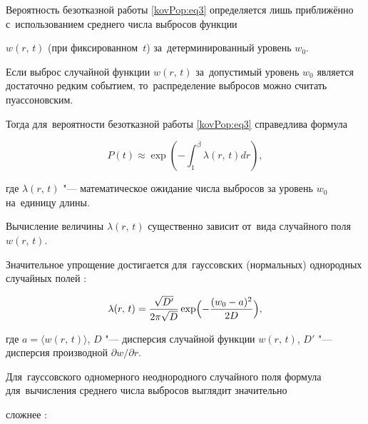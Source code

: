 Вероятность безотказной работы \eqref{kovPop:eq3} определяется лишь приближённо с~использованием среднего числа выбросов функции

$w(r,\,t)$ (при фиксированном~$t$) за~детерминированный уровень $w_0$. 

Если выброс случайной функции $w(r,\,t)$ за~допустимый уровень $w_0$ является достаточно редким событием, то~распределение выбросов можно считать пуассоновским. 

Тогда для~вероятности безотказной работы \eqref{kovPop:eq3} справедлива формула \cite{KovalPopov:Bolotin}

\begin{equation}

\label{kovPop:eq4} P(t) \approx \exp \left( { -

\int _1^\beta {\lambda (r,\,t)dr} } \right),

\end{equation}

где $\lambda (r,\,t)$ "--- математическое ожидание числа выбросов за уровень $w_0$ на~единицу длины.



Вычисление величины $\lambda (r,\,t)$ существенно зависит от~вида случайного поля $w(r,\,t)$. 

Значительное упрощение достигается для~гауссовских (нормальных) однородных случайных полей \cite{KovalPopov:Bolotin}:

\begin{equation}

\label{kovPop:eq5} \lambda (r,\,t) = \frac{\sqrt {D'} }{2\pi \sqrt

D }\exp \Bigl(- \frac{(w_0 - a)^2}{2D}\Bigr),

\end{equation}

где $a = \langle w(r,\,t)\rangle$, $D$ "--- дисперсия случайной функции $w(r,\,t)$, $D'$ "--- дисперсия производной ${\partial w}/{\partial r}$.



Для~гауссовского одномерного неоднородного случайного поля формула для~вычисления среднего числа выбросов выглядит значительно

сложнее \cite{KovalPopov:Bolotin}:

